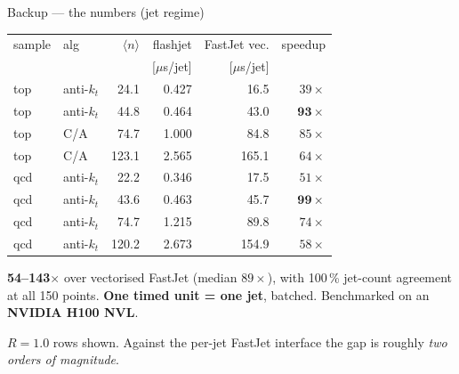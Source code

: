 \documentclass[aspectratio=169,10pt]{beamer}
\newcommand{\smallnote}[1]{{\footnotesize\color{fjgray} #1}}
\newcommand{\akt}{anti-$k_t$}
\begin{document}
\begin{frame}{Backup --- the numbers (jet regime)}
\begin{center}
\small
\begin{tabular}{@{}llrrrr@{}}
\toprule
sample & alg & $\langle n\rangle$ & flashjet & FastJet vec. & speedup\\
 & & & [$\mu$s/jet] & [$\mu$s/jet] & \\
\midrule
top & \akt & 24.1 & 0.427 & 16.5 & $39\times$\\
top & \akt & 44.8 & 0.464 & 43.0 & $\mathbf{93\times}$\\
top & C/A  & 74.7 & 1.000 & 84.8 & $85\times$\\
top & C/A  & 123.1 & 2.565 & 165.1 & $64\times$\\
\midrule
qcd & \akt & 22.2 & 0.346 & 17.5 & $51\times$\\
qcd & \akt & 43.6 & 0.463 & 45.7 & $\mathbf{99\times}$\\
qcd & \akt & 74.7 & 1.215 & 89.8 & $74\times$\\
qcd & \akt & 120.2 & 2.673 & 154.9 & $58\times$\\
\bottomrule
\end{tabular}
\end{center}
\medskip
\begin{block}{}
\small \textbf{54--143$\times$} over vectorised FastJet (median $89\times$), with
100\,\% jet-count agreement at all 150 points. \textbf{One timed unit = one jet},
batched. Benchmarked on an \textbf{NVIDIA H100 NVL}.
\end{block}
\smallskip
\smallnote{$R=1.0$ rows shown. Against the per-jet FastJet interface the gap is
roughly \emph{two orders of magnitude}.}
\end{frame}
\end{document}
